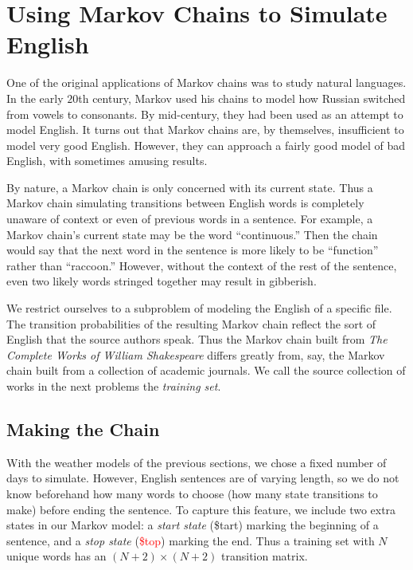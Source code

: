 \section*{Using Markov Chains to Simulate English} %
One of the original applications of Markov chains was to study natural languages.
In the early $20$th century, Markov used his chains to model how Russian switched from vowels to consonants.
By mid-century, they had been used as an attempt to model English.
It turns out that Markov chains are, by themselves, insufficient to model very good English.
However, they can approach a fairly good model of bad English, with sometimes amusing results.

By nature, a Markov chain is only concerned with its current state.
Thus a Markov chain simulating transitions between English words is completely unaware of context or even of previous words in a sentence.
For example, a Markov chain's current state may be the word ``continuous.''
Then the chain would say that the next word in the sentence is more likely to be ``function'' rather than ``raccoon.''
However, without the context of the rest of the sentence, even two likely words stringed together may result in gibberish.

We restrict ourselves to a subproblem of modeling the English of a specific file.
The transition probabilities of the resulting Markov chain reflect the sort of English that the source authors speak.
Thus the Markov chain built from \emph{The Complete Works of William Shakespeare} differs greatly from, say, the Markov chain built from a collection of academic journals.
We call the source collection of works in the next problems the \emph{training set}.

\subsection*{Making the Chain} %

With the weather models of the previous sections, we chose a fixed number of days to simulate.
However, English sentences are of varying length, so we do not know beforehand how many words to choose (how many state transitions to make) before ending the sentence.
To capture this feature, we include two extra states in our Markov model: a \emph{start state} (\textcolor[rgb]{0,.6,0}{\$tart}) marking the beginning of a sentence, and a \emph{stop state} (\textcolor{red}{\$top}) marking the end.
Thus a training set with $N$ unique words has an $(N+2)\times (N+2)$ transition matrix.

